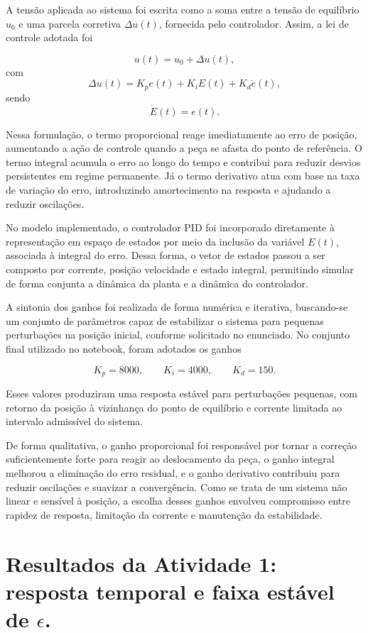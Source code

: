 A tensão aplicada ao sistema foi escrita como a soma entre a tensão de equilíbrio $u_0$ e uma parcela corretiva $\Delta u(t)$, fornecida pelo controlador. Assim, a lei de controle adotada foi

  \[
  u(t) = u_0 + \Delta u(t),
  \]
  com
  \[
  \Delta u(t) = K_p e(t) + K_i E(t) + K_d \dot{e}(t),
  \]
  sendo
  \[
  \dot{E}(t) = e(t).
  \]

Nessa formulação, o termo proporcional reage imediatamente ao erro de posição, aumentando a ação de controle quando a peça se afasta do ponto de referência. O termo integral acumula o erro ao longo do tempo e contribui para reduzir desvios persistentes em regime permanente. Já o termo derivativo atua com base na taxa de variação do erro, introduzindo amortecimento na resposta e ajudando a reduzir oscilações.

No modelo implementado, o controlador PID foi incorporado diretamente à representação em espaço de estados por meio da inclusão da variável $E(t)$, associada à integral do erro. Dessa forma, o vetor de estados passou a ser composto por corrente, posição velocidade e estado integral, permitindo simular de forma conjunta a dinâmica da planta e a dinâmica do controlador.

A sintonia dos ganhos foi realizada de forma numérica e iterativa, buscando-se um conjunto de  parâmetros capaz de estabilizar o sistema para pequenas perturbações na posição inicial, conforme solicitado no enunciado. No conjunto final utilizado no notebook, foram adotados os ganhos

  \[
  K_p = 8000, \qquad K_i = 4000, \qquad K_d = 150.
  \]

Esses valores produziram uma resposta estável para perturbações pequenas, com retorno da posição à
vizinhança do ponto de equilíbrio e corrente limitada ao intervalo admissível do sistema.

De forma qualitativa, o ganho proporcional foi responsável por tornar a correção suficientemente forte para reagir ao deslocamento da peça, o ganho integral melhorou a eliminação do erro residual, e o ganho derivativo contribuiu para reduzir oscilações e suavizar a convergência. Como se trata de um sistema não linear e sensível à posição, a escolha desses ganhos envolveu compromisso entre rapidez de resposta, limitação da corrente e manutenção da estabilidade.

\section{ Resultados da Atividade 1: resposta temporal e faixa estável de $\epsilon$.}

